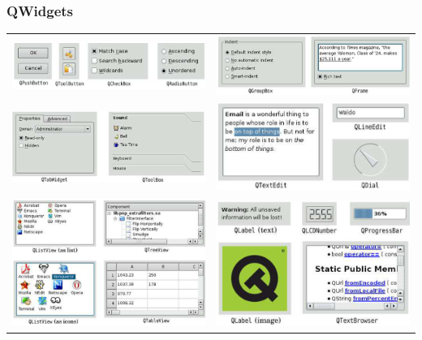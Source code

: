 \subsubsection{QWidgets}
\begin{tabular}{c c}
	\includegraphics[width=9cm]{images/button_1.png}& \includegraphics[width=9cm]{images/button_2.png}\\
	\includegraphics[width=9cm]{images/button_3.png}& \includegraphics[width=9cm]{images/button_7.png}\\
	\includegraphics[width=9cm]{images/button_4.png}&
	\includegraphics[width=9cm]{images/button_5.png}\\

\end{tabular}
